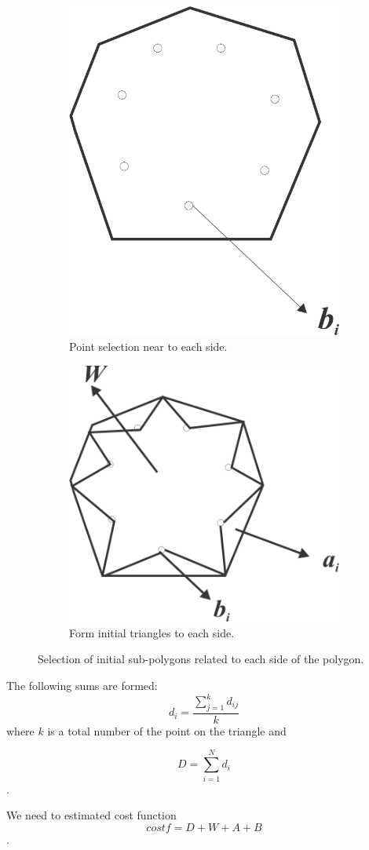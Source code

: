 \documentclass[11pt,leqno]{book}
\begin{document}
\begin{figure}[h!]
\centering
\begin{subfigure}{.5\textwidth}
  \centering
  \includegraphics[width=.5\linewidth]{pic04.png}
  \caption{Point selection near to each side.}
  \label{fig:sub5}
\end{subfigure}%
\begin{subfigure}{.5\textwidth}
  \centering
  \includegraphics[width=.6\linewidth]{pic05.png}
  \caption{Form initial triangles to each side.}
  \label{fig:sub6}
\end{subfigure}
\caption{Selection of initial sub-polygons related to each side of the polygon.}
\label{fig:three}
\end{figure}

The  following sums are formed: $$d_i = \frac{\sum_{j=1}^k d_{ij}}k$$
where $k$ is a  total number of the point on the triangle  and

$$D = \sum_{i=1}^N d_i$$.

We need to estimated cost function
$$cost f = D+W + A + B$$.
\end{document}
